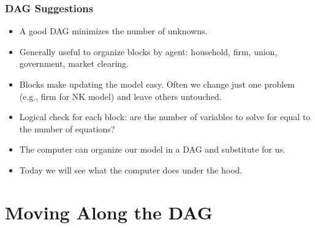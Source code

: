\documentclass[english,xcolor=svgnames]{beamer}
\begin{document}
	\begin{frame}
		\frametitle{DAG Suggestions}
			\begin{itemize}
				\item A good DAG minimizes the number of unknowns.
				\item Generally useful to organize blocks by agent: household, firm, union, government, market clearing.
				\item Blocks make updating the model easy. Often we change just one problem (e.g., firm for NK model) and leave others untouched.
				\item Logical check for each block: are the number of variables to solve for equal to the number of equations?
				\item The computer can organize our model in a DAG and substitute for us.
				\item Today we will see what the computer does under the hood.
			\end{itemize}
	\end{frame}

\section{Moving Along the DAG}
\end{document}

